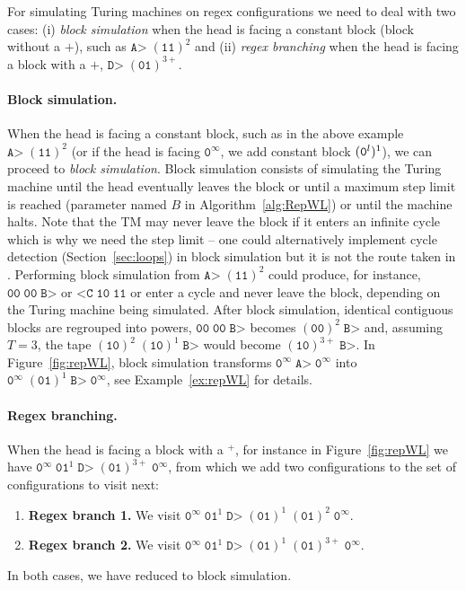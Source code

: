 For simulating Turing machines on regex configurations we need to deal with two cases: (i) \textit{block simulation} when the head is facing a constant block (\ie block without a $+$), such as $\texttt{A>} \; (\texttt{11})^2$ and (ii) \textit{regex branching} when the head is facing a block with a $+$, \eg $\texttt{D>} \; (\texttt{01})^{3+}$.

\paragraph{Block simulation.} When the head is facing a constant block, such as in the above example $\texttt{A>} \; (\texttt{11})^2$ (or if the head is facing $\texttt{0}^\infty$, we add constant block $(\texttt{0}^l)^1$), we can proceed to \textit{block simulation}.
Block simulation consists of simulating the Turing machine until the head eventually leaves the block or until a maximum step limit is reached (parameter named $B$ in Algorithm~\ref{alg:RepWL}) or until the machine halts. Note that the TM may never leave the block if it enters an infinite cycle which is why we need the step limit -- one could alternatively implement cycle detection (Section~\ref{sec:loops}) in block simulation but it is not the route taken in \CoqBB. Performing block simulation from $\texttt{A>} \; (\texttt{11})^2$ could produce, for instance, $\texttt{00}\; \texttt{00} \; \texttt{B>}$ or $\texttt{<C} \; \texttt{10} \; \texttt{11} $ or enter a cycle and never leave the block, depending on the Turing machine being simulated. After block simulation, identical contiguous blocks are regrouped into powers, \eg $\texttt{00} \; \texttt{00} \; \texttt{B>}$ becomes $(\texttt{00})^2 \; \texttt{B>}$ and, assuming $T=3$, the tape $(\texttt{10})^2\; (\texttt{10})^1\; \texttt{B>}$ would become $(\texttt{10})^{3+}\; \texttt{B>}$. In Figure~\ref{fig:repWL}, block simulation transforms $\texttt{0}^\infty \; \texttt{A>} \; \texttt{0}^\infty$ into $\texttt{0}^\infty \; (\texttt{01})^1 \; \texttt{B>} \; \texttt{0}^\infty$, see Example~\ref{ex:repWL} for details.

\paragraph{Regex branching.} When the head is facing a block with a $^+$, for instance in Figure~\ref{fig:repWL} we have $\texttt{0}^\infty \; \texttt{01}^1 \; \texttt{D>} \; (\texttt{01})^{3+} \; \texttt{0}^\infty$, from which we add two configurations to the set of configurations to visit next:
\begin{enumerate}
    \item \textbf{Regex branch 1.} We visit $\texttt{0}^\infty \; \texttt{01}^1 \; \texttt{D>} \; (\texttt{01})^1 \; (\texttt{01})^{2} \; \texttt{0}^\infty$.
    \item \textbf{Regex branch 2.} We visit $\texttt{0}^\infty \; \texttt{01}^1 \; \texttt{D>} \; (\texttt{01})^1 \; (\texttt{01})^{3+} \; \texttt{0}^\infty$.
\end{enumerate}
In both cases, we have reduced to block simulation.

